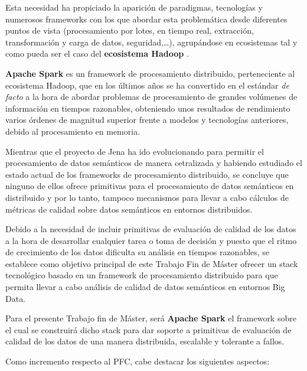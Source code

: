 Esta necesidad ha propiciado la aparición de paradigmas, tecnologías y numerosos
frameworks con los que abordar esta problemática desde diferentes puntos de
vista (procesamiento por lotes, en tiempo real, extracción, transformación y
carga de datos, seguridad,\ldots), agrupándose en ecosistemas tal y como pueda
ser el caso del \textbf{ecosistema Hadoop} \cite{HADOOP-ecosystem}.

\textbf{Apache Spark} \cite{SPARK} es un framework de procesamiento distribuido,
perteneciente al ecosistema Hadoop, que en los últimos años se ha convertido en
el estándar \textit{de facto} a la hora de abordar problemas de procesamiento de
grandes volúmenes de información en tiempos razonables, obteniendo unos
resultados de rendimiento varios órdenes de magnitud superior frente a modelos y
tecnologías anteriores, debido al procesamiento en memoria.

Mientras que el proyecto de Jena ha ido evolucionando para permitir el
procesamiento de datos semánticos de manera cetralizada y habiendo estudiado el
estado actual de los frameworks de procesamiento distribuido, se concluye que
ninguno de ellos ofrece primitivas para el procesamiento de datos semánticos en
distribuido y por lo tanto, tampoco mecanismos para llevar a cabo cálculos de
métricas de calidad sobre datos semánticos en entornos distribuidos.

Debido a la necesidad de incluir primitivas de evaluación de calidad de los
datos a la hora de desarrollar cualquier tarea o toma de decisión y puesto que
el ritmo de crecimiento de los datos dificulta su análisis en tiempos
razonables, se establece como objetivo principal de este Trabajo Fin de Máster
ofrecer un stack tecnológico basado en un framework de procesamiento distribuido
para que permita llevar a cabo análisis de calidad de datos semánticos en
entornos Big Data.

Para el presente Trabajo fin de Máster, será \textbf{Apache Spark} el framework
sobre el cual se construirá dicho stack para dar soporte a primitivas de
evaluación de calidad de los datos de una manera distribuida, escalable y
tolerante a fallos.

Como incremento respecto al PFC, cabe destacar los siguientes aspectos:

